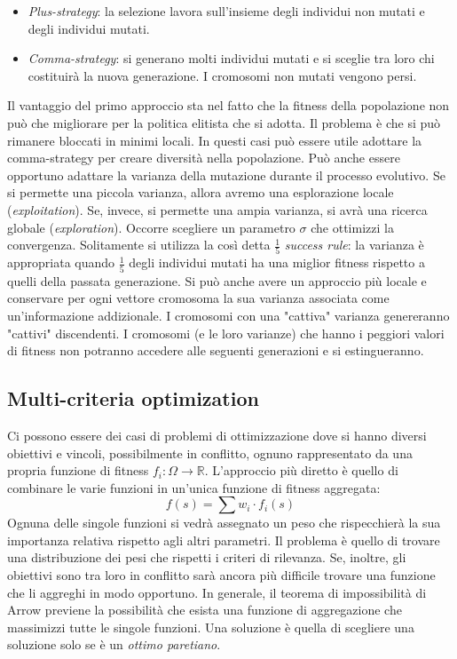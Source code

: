 \documentclass[10pt,a4paper]{article}
\begin{document}
\begin{itemize}
\item{\emph{Plus-strategy}: la selezione lavora sull'insieme degli individui non mutati e degli individui mutati. }
\item{\emph{Comma-strategy}: si generano molti individui mutati e si sceglie tra loro chi costituirà la nuova generazione. I cromosomi non mutati vengono persi.}
\end{itemize}

Il vantaggio del primo approccio sta nel fatto che la fitness della popolazione non può che migliorare per la politica elitista che si adotta. Il problema è che si può rimanere bloccati in minimi locali. In questi casi può essere utile adottare la comma-strategy per creare diversità nella popolazione. Può anche essere opportuno adattare la varianza della mutazione durante il processo evolutivo. Se si permette una piccola varianza, allora avremo una esplorazione locale (\emph{exploitation}). Se, invece, si permette una ampia varianza, si avrà una ricerca globale (\emph{exploration}). Occorre scegliere un parametro $\sigma$ che ottimizzi la convergenza. Solitamente si utilizza la così detta $\frac{1}{5}$ \emph{success rule}: la varianza è appropriata quando $\frac{1}{5}$ degli individui mutati ha una miglior fitness rispetto a quelli della passata generazione. Si può anche avere un approccio più locale e conservare per ogni vettore cromosoma la sua varianza associata come un'informazione addizionale. I cromosomi con una "cattiva" varianza genereranno "cattivi" discendenti. I cromosomi (e le loro varianze) che hanno i peggiori valori di fitness non potranno accedere alle seguenti generazioni e si estingueranno. 

\subsection{Multi-criteria optimization}

Ci possono essere dei casi di problemi di ottimizzazione dove si hanno diversi obiettivi e vincoli, possibilmente in conflitto, ognuno rappresentato da una propria funzione di fitness $f_i : \Omega \to \mathbb{R}$. L'approccio più diretto è quello di combinare le varie funzioni in un'unica funzione di fitness aggregata:
$$
f(s) = \sum w_i \cdot f_i(s)
$$
Ognuna delle singole funzioni si vedrà assegnato un peso che rispecchierà la sua importanza relativa rispetto agli altri parametri. Il problema è quello di trovare una distribuzione dei pesi che rispetti i criteri di rilevanza. Se, inoltre, gli obiettivi sono tra loro in conflitto sarà ancora più difficile trovare una funzione che li aggreghi in modo opportuno. In generale, il teorema di impossibilità di Arrow previene la possibilità che esista una funzione di aggregazione che massimizzi tutte le singole funzioni. Una soluzione è quella di scegliere una soluzione solo se è un \emph{ottimo paretiano}.
\end{document}
